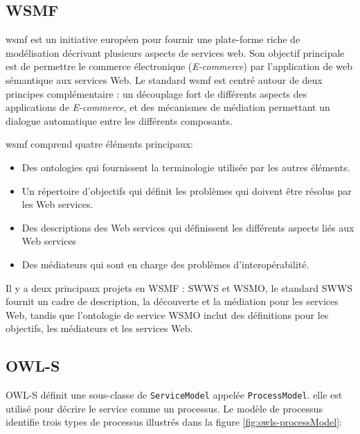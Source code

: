   \subsection{WSMF}
  \label{sec:wsmf}
  \acrshort{wsmf} \cite{fensel2002web} est un initiative européen pour
  fournir une plate-forme riche de modélisation décrivant plusieurs
  aspects de services web. Son objectif principale est de permettre le
  commerce électronique (\emph{E-commerce}) par l'application de web
  sémantique aux services Web.  Le standard \acrshort{wsmf} est centré
  autour de deux principes complémentaire \cite{baryannis2010}: un
  découplage fort de différents aspects des applications de
  \textit{E-commerce}, et des mécanismes de médiation permettant un
  dialogue automatique entre les différents composants.\medskip

  \acrshort{wsmf} comprend quatre éléments principaux:

  \SpecialItem
  \begin{itemize}
  \item Des ontologies qui fournissent la terminologie utilisée par
    les autres éléments.

  \item Un répertoire d'objectifs qui définit les problèmes qui
    doivent être résolus par les Web services.

  \item Des descriptions des Web services qui définissent les
    différents aspects liés aux Web services

  \item Des médiateurs qui sont en charge des problèmes
    d'interopérabilité.
  \end{itemize}
  \enddescription

  Il y a deux principaux projets en WSMF : \textsc{SWWS} et
  \textsc{WSMO}, le standard \textsc{SWWS} fournit un cadre de
  description, la découverte et la médiation pour les services Web,
  tandis que l'ontologie de service \textsc{WSMO} inclut des
  définitions pour les objectifs, les médiateurs et les services Web.

  \subsection{OWL-S}
  \label{sec:owl-s}

  

  \textsc{OWL-S} définit une sous-classe de \verb|ServiceModel|
  appelée \verb|ProcessModel|. elle est utilisé pour décrire le
  service comme un processus. Le modèle de processus identifie trois
  types de processus illustrés dans la figure
  \ref{fig:owls-processModel}:

